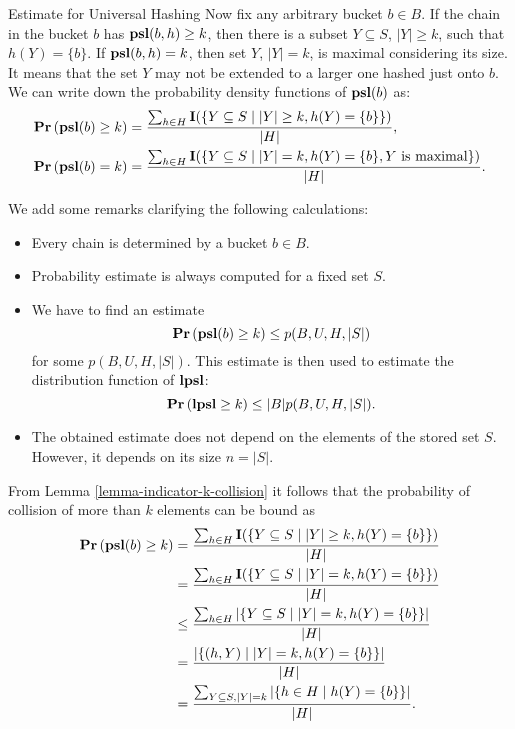 \begin{section}{Estimate for Universal Hashing}
Now fix any arbitrary bucket $b \in B$. If the chain in the bucket $b$ has $\mathbf{psl}(b, h) \geq k$, then there is a subset $Y \subseteq S$, $|Y| \geq k$, such that $h(Y) = \{ b \}$. If $\mathbf{psl}(b, h) = k$, then set $Y$, $|Y| = k$, is maximal considering its size. It means that the set $Y$ may not be extended to a larger one hashed just onto $b$. We can write down the probability density functions of $\mathbf{psl}(b)$ as:
\begin{displaymath}
\begin{split}
\mathbf{Pr}\left(\mathbf{psl}(b) \geq k\right) & = \frac{\sum\displaylimits_{h \in H} \mathbf{I}(\{ Y \subseteq S \mid |Y| \geq k, h(Y) = \{ b \} \})}{|H|} \text{,} \\
\mathbf{Pr}\left(\mathbf{psl}(b) = k\right) & = \frac{\sum\displaylimits_{h \in H} \mathbf{I}(\{ Y \subseteq S \mid |Y| = k, h(Y) = \{ b \}, Y \text{ is maximal} \})}{|H|} \text{.}
\end{split}
\end{displaymath}

We add some remarks clarifying the following calculations:
\begin{itemize}
\item Every chain is determined by a bucket $b \in B$.
\item Probability estimate is always computed for a fixed set $S$.
\item We have to find an estimate \[ \mathbf{Pr}\left(\mathbf{psl}(b) \geq k\right) \leq p(B, U, H, |S|) \] for some $p(B,U,H,|S|)$. This estimate is then used to estimate the distribution function of $\mathbf{lpsl}$: \[ \mathbf{Pr}\left(\mathbf{lpsl} \geq k\right) \leq |B| p(B, U, H, |S|) \text{.} \] 
\item The obtained estimate does not depend on the elements of the stored set $S$. However, it depends on its size $n = |S|$.
\end{itemize}

From Lemma \ref{lemma-indicator-k-collision} it follows that the probability of collision of more than $k$ elements can be bound as
\begin{displaymath}
\begin{split}
\mathbf{Pr}\left(\mathbf{psl}(b) \geq k\right)
	& = \frac{\sum\displaylimits_{h \in H} \mathbf{I}(\{ Y \subseteq S \mid |Y| \geq k, h(Y) = \{ b \} \})}{|H|} \\
	& = \frac{\sum\displaylimits_{h \in H} \mathbf{I}(\{ Y \subseteq S \mid |Y| = k, h(Y) = \{ b \} \})}{|H|} \\
	& \leq \frac{\sum\displaylimits_{h \in H} |\{ Y \subseteq S \mid |Y| = k, h(Y) = \{ b \} \}|}{|H|} \\
	& = \frac{|\{ (h, Y) \mid |Y| = k, h(Y) = \{ b \} \}|}{|H|} \\
	& = \frac{\sum\displaylimits_{Y \subseteq S, |Y| = k} | \{ h \in H \mid h(Y) = \{ b \} \}|}{|H|} \text{.}
\end{split}
\end{displaymath}


\end{section}
